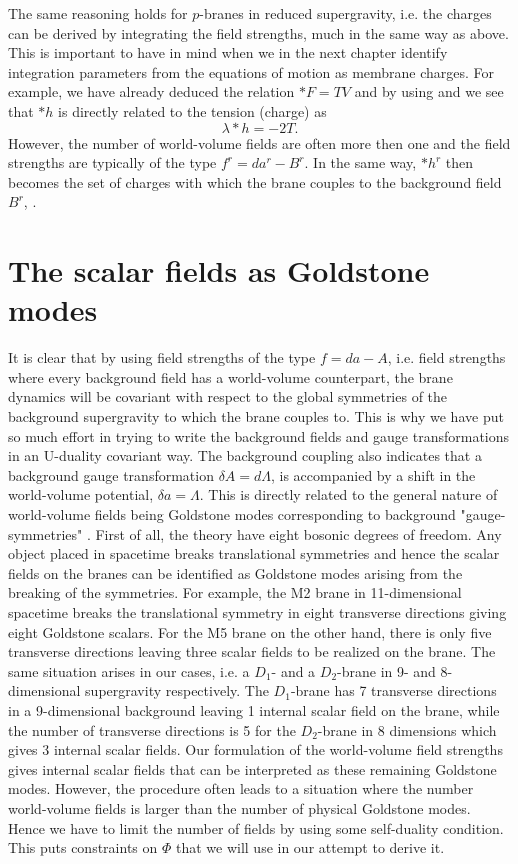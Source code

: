 The same reasoning holds for $p$-branes in reduced supergravity, i.e. the charges can be derived by integrating the field strengths, 
much in the same way as above. This is important to have in mind when we in the next chapter identify integration parameters 
from the equations of motion as membrane charges. For example, we have already deduced the relation $*F=TV$ and by using 
 and  we see that $*h$ is directly related to the tension (charge) as
\begin{equation}
\lambda *h =-2T.
\end{equation}
However, the number of world-volume fields are often more then one and the field strengths are typically of the type 
$f^r = da^r - B^r$. In the same way, $*h^r$ then becomes the set of charges with which the brane couples to the background field $B^r$, 
\cite{ref11}.

\section{The scalar fields as Goldstone modes}
It is clear that by using field strengths of the type $f=da-A$, i.e. field strengths where every background field 
has a world-volume counterpart, the brane dynamics will be covariant with respect to the global symmetries of the 
background supergravity to which the brane couples to. This is why we have put so much effort in trying to write the 
background fields and gauge transformations in an U-duality covariant way. The background coupling also indicates that
a background gauge transformation $\delta A= d\Lambda$, is accompanied by a shift in the world-volume potential, $\delta a= \Lambda$. 
This is directly related to the general nature of world-volume fields being Goldstone modes corresponding to
background "gauge-symmetries" \cite{goldstone_tensor_modes}. First of all, the theory have eight bosonic degrees of freedom. Any object placed in spacetime 
breaks translational symmetries and hence the scalar fields on the branes can be identified as Goldstone modes arising 
from the breaking of the symmetries. For example, the M2 brane in 11-dimensional spacetime breaks the translational 
symmetry in eight transverse directions giving eight Goldstone scalars. For the M5 brane on the other hand, there is only five 
transverse directions leaving three scalar fields to be realized on the brane. The same situation arises in our cases, 
i.e. a $D_1$- and a $D_2$-brane in 9- and 8-dimensional supergravity respectively. The $D_1$-brane has 7 transverse directions in 
a 9-dimensional background leaving 1 internal scalar field on the brane, while the number of transverse directions is 
5 for the $D_2$-brane in 8 dimensions which gives 3 internal scalar fields. Our formulation of the world-volume field strengths 
gives internal scalar fields that can be interpreted as these remaining Goldstone modes. However, the procedure often leads to a
situation where the number world-volume fields is larger than the number of physical Goldstone modes. Hence we have to limit the number 
of fields by using some self-duality condition. This puts constraints on $\Phi$ that we will use in our attempt to derive it.\\
\\





